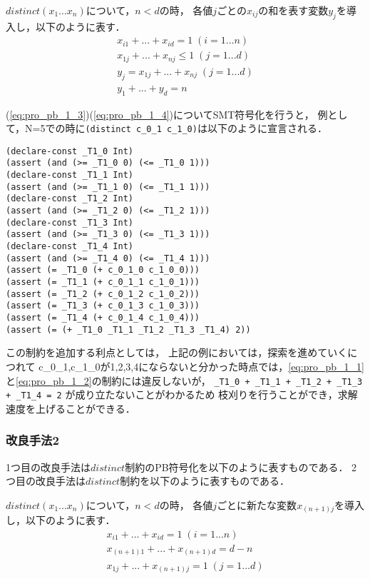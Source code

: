 $distinct(x_1 ... x_n)$について，$n < d$の時，
各値$j$ごとの$x_{ij}$の和を表す変数$y_j$を導入し，以下のように表す．
\begin{eqnarray}
    x_{i1} + ... + x_{id}=1 \; (i=1 ... n) \label{eq:pro_pb_1_1}\\
    x_{1j} + ... + x_{nj}\leq1 \; (j=1 ... d) \label{eq:pro_pb_1_2}\\
    y_j = x_{1j} + ... + x_{nj} \; (j=1 ... d) \label{eq:pro_pb_1_3}\\
    y_1 + ... + y_d =n \label{eq:pro_pb_1_4}
\end{eqnarray}

(\ref{eq:pro_pb_1_3})(\ref{eq:pro_pb_1_4})についてSMT符号化を行うと，
例として，N=5での時に\verb|(distinct c_0_1 c_1_0)|は以下のように宣言される．

{ \footnotesize \begin{verbatim}
(declare-const _T1_0 Int)
(assert (and (>= _T1_0 0) (<= _T1_0 1)))
(declare-const _T1_1 Int)
(assert (and (>= _T1_1 0) (<= _T1_1 1)))
(declare-const _T1_2 Int)
(assert (and (>= _T1_2 0) (<= _T1_2 1)))
(declare-const _T1_3 Int)
(assert (and (>= _T1_3 0) (<= _T1_3 1)))
(declare-const _T1_4 Int)
(assert (and (>= _T1_4 0) (<= _T1_4 1)))
(assert (= _T1_0 (+ c_0_1_0 c_1_0_0)))
(assert (= _T1_1 (+ c_0_1_1 c_1_0_1)))
(assert (= _T1_2 (+ c_0_1_2 c_1_0_2)))
(assert (= _T1_3 (+ c_0_1_3 c_1_0_3)))
(assert (= _T1_4 (+ c_0_1_4 c_1_0_4)))
(assert (= (+ _T1_0 _T1_1 _T1_2 _T1_3 _T1_4) 2))
\end{verbatim}}

この制約を追加する利点としては，
上記の例においては，探索を進めていくにつれて
c\_0\_1,c\_1\_0が1,2,3,4にならないと分かった時点では，\ref{eq:pro_pb_1_1}と\ref{eq:pro_pb_1_2}の制約には違反しないが，
{\small \verb|_T1_0 + _T1_1 + _T1_2 + _T1_3 + _T1_4 = 2| }が成り立たないことがわかるため
枝刈りを行うことができ，求解速度を上げることができる．

\subsubsection{改良手法2}\label{sec:pro_hint_3_2}
1つ目の改良手法は$distinct$制約のPB符号化を以下のように表すものである．
2つ目の改良手法は$distinct$制約を以下のように表すものである．

$distinct(x_1 ... x_n)$について，$n < d$の時，
各値$j$ごとに新たな変数$x_{(n+1)j}$を導入し，以下のように表す．
\begin{eqnarray}
    x_{i1} + ... + x_{id}=1 \; (i=1 ... n) \label{eq:pro_pb_2_1}\\
    x_{(n+1)1} + ... + x_{(n+1)d}=d-n \label{eq:pro_pb_2_2}\\
    x_{1j} + ... + x_{(n+1)j}=1 \; (j=1 ... d) \label{eq:pro_pb_2_3}\\
\end{eqnarray}

